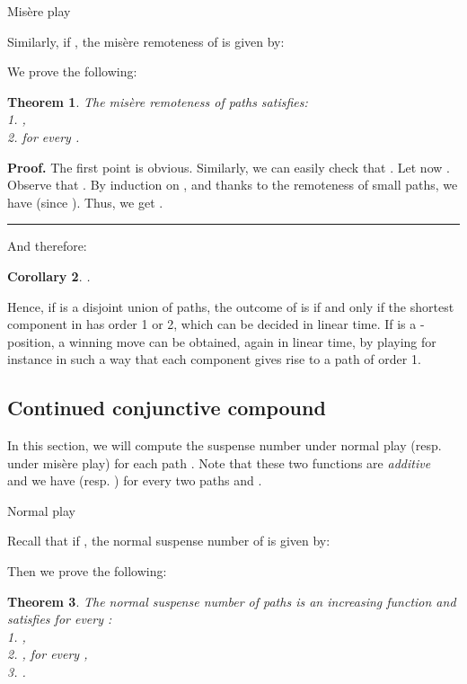 \documentclass[11pt]{article}
\newcommand{\centre}[1]{\begin{center}#1\end{center}}
\newtheorem{theorem}{Theorem}
\newtheorem{corollary}[theorem]{Corollary}
\newcommand\qed{\mbox{}\hfill\rule{0.5em}{0.809em}\par\vskip 5mm}
\newenvironment{proof}[0]{\noindent\textbf{Proof.}}{\qed}
\begin{document}
\vskip 4mm

\centre{{\sc Mis\`ere play}}

\noindent
Similarly, if , the mis\`ere remoteness 
of  is given by:


We prove the following:

\begin{theorem}
The mis\`ere remoteness  of paths satisfies:\\
1. , \\
2.  for every .
\end{theorem}

\begin{proof}
The first point is obvious. Similarly, we can easily check that .
Let now . 
Observe that . 
By induction on , and thanks to the remoteness of small paths, we have
 (since ). 
Thus, we get .
\end{proof}

And therefore:

\begin{corollary}
.
\end{corollary}

Hence, if  is a disjoint union of paths, the outcome
of  is  if and only if the shortest component in 
has order 1 or 2, which can be decided in linear time. 
If  is a -position, a winning
move can be obtained, again in linear time, by playing for instance in
such a way that each component gives rise to a path of order 1.

\subsection{Continued conjunctive compound}

In this section, we will compute the suspense number 
 under normal play (resp.  under mis\`ere play)
for each path .
Note that these two functions are {\em additive}~\cite[p.~177]{ONAG}
and we have 
(resp. ) for every
two paths  and .

\vskip 4mm

\centre{{\sc Normal play}}

\noindent
Recall that if , the normal suspense number 
of  is given by:


Then we prove the following:

\begin{theorem}
The normal suspense number  of paths is an increasing
function and satisfies for every :\\
1.  ,\\
2.  , for every ,\\
3.  .
\label{th:normal_suspense}
\end{theorem}
\end{document}
